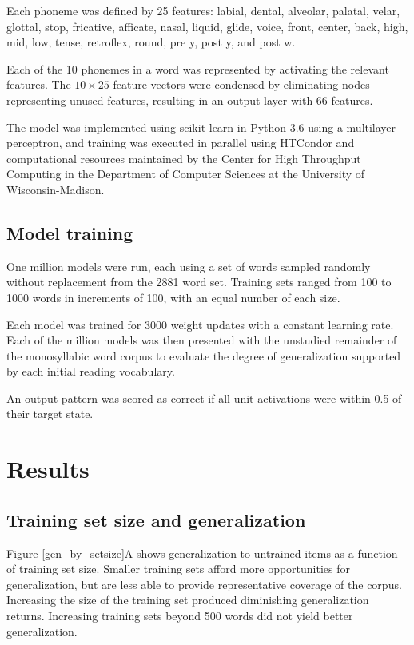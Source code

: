 \documentclass[10pt,letterpaper]{article}
\newcommand{\xy}[2]{$#1\times#2$}
\begin{document}
Each phoneme was defined by 25 features: labial, dental, alveolar, palatal, velar, glottal, stop, fricative, afficate, nasal, liquid, glide, voice, front, center, back, high, mid, low, tense, retroflex, round, pre y, post y, and post w.

Each of the 10 phonemes in a word was represented by activating the relevant features. The \xy{10}{25} feature vectors were condensed by eliminating nodes representing unused features, resulting in an output layer with 66 features.

The model was implemented using scikit-learn in Python 3.6 using a multilayer perceptron, and training was executed in parallel using HTCondor \cite{Thain2005} and computational resources maintained by the Center for High Throughput Computing in the Department of Computer Sciences at the University of Wisconsin-Madison.

\subsection{Model training}
One million models were run, each using a set of words sampled randomly without replacement from the 2881 word set. Training sets ranged from 100 to 1000 words in increments of 100, with an equal number of each size.

Each model was trained for 3000 weight updates with a constant learning rate. Each of the million models was then presented with the unstudied remainder of the monosyllabic word corpus to evaluate the degree of generalization supported by each initial reading vocabulary.

An output pattern was scored as correct if all unit activations were within 0.5 of their target state.

\section{Results}

\subsection{Training set size and generalization}
Figure \ref{gen_by_setsize}A shows generalization to untrained items as a function of training set size.  Smaller training sets afford more opportunities for generalization, but are less able to provide representative coverage of the corpus. Increasing the size of the training set produced diminishing generalization returns. Increasing training sets beyond 500 words did not yield better generalization. 
\end{document}
